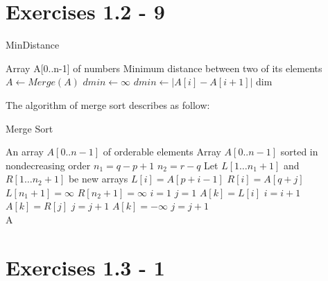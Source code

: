 \documentclass{article}
\begin{document}
\section{Exercises 1.2 - 9}

\begin{algorithm}[H]
 \caption{MinDistance}
   \begin{algorithmic}[1]
     \INPUT Array A[0..n-1] of numbers
     \OUTPUT Minimum distance between two of its elements
     \State $A \leftarrow Merge(A)$
     \State $ dmin \leftarrow \infty$
     \State $dmin \leftarrow |A[i] - A[i+1]|$
     \EndIf
     \EndFor
     \State \Return dim
   \end{algorithmic}
\end{algorithm}

The algorithm of merge sort describes as follow:

\begin{algorithm}[H]
 \caption{Merge Sort}
   \begin{algorithmic}[1]
     \INPUT An array $A[0..n-1]$ of orderable elements
     \OUTPUT Array $A[0..n-1]$ sorted in nondecreasing order
      \State ${n_1} = q - p + 1$
      \State ${n_2} = r - q$
      \State Let $L[1 \ldots {n_1} + 1]$ and $R[1 \ldots {n_2} + 1]$ be new arrays
          \State $L[i] = A[p + i - 1]$
      \EndFor
          \State $R[i] = A[q + j]$
      \EndFor
      \State $L[{n_1} + 1] =  \infty $
      \State $R[{n_2} + 1] =  \infty $
      \State $i = 1$
      \State $j = 1$
              \State $A[k] = L[i]$
              \State $i = i + 1$
              \State $A[k] = R[j]$
              \State $j = j + 1$
          \Else
              \State $A[k] = - \infty$
              \State $j = j + 1$
          \EndIf
      \EndFor
      \EndFunction
      \\
      \Return A
      \EndIf
      \EndFunction

   \end{algorithmic}
\end{algorithm}

\section{Exercises 1.3 - 1}
\end{document}
